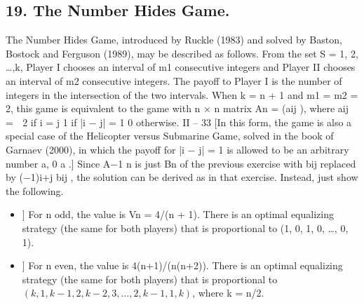 \documentclass[]{report}
\begin{document}
\subsection{19. The Number Hides Game.} 
The Number Hides Game, introduced by Ruckle
(1983) and solved by Baston, Bostock and Ferguson (1989), may be described as follows.
From the set S = {1, 2, \ldots,k}, Player I chooses an interval of m1 consecutive integers
and Player II chooses an interval of m2 consecutive integers. The payoff to Player I is
the number of integers in the intersection of the two intervals. When k = n + 1 and
m1 = m2 = 2, this game is equivalent to the game with n × n matrix An = (aij ), where
aij =
 2 if i = j
1 if |i − j| = 1
0 otherwise.
II – 33
[In this form, the game is also a special case of the Helicopter versus Submarine
Game, solved in the book of Garnaev (2000), in which the payoff for |i − j| = 1 is allowed
to be an arbitrary number a, 0 \leq a .] Since A−1 n is just Bn of the previous exercise
with bij replaced by (−1)i+j bij , the solution can be derived as in that exercise. Instead,
just show the following.
\begin{itemize}
\item[\item[(a)]] For n odd, the value is Vn = 4/(n + 1). There is an optimal equalizing strategy
(the same for both players) that is proportional to (1, 0, 1, 0, \ldots, 0, 1).
\item[\item[(b)]] For n even, the value is 4(n+1)/(n(n+2)). There is an optimal equalizing strategy
(the same for both players) that is proportional to $(k, 1, k − 1, 2, k − 2, 3, \ldots, 2, k − 1, 1, k)$,
where k = n/2.
\end{itemize}
\end{document}
